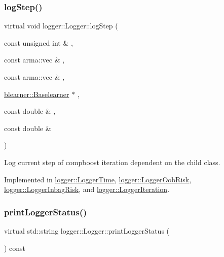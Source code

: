\subsubsection{\texorpdfstring{log\+Step()}{logStep()}}
{\footnotesize\ttfamily virtual void logger\+::\+Logger\+::log\+Step (\begin{DoxyParamCaption}\item[{const unsigned int \&}]{,  }\item[{const arma\+::vec \&}]{,  }\item[{const arma\+::vec \&}]{,  }\item[{\hyperlink{classblearner_1_1_baselearner}{blearner\+::\+Baselearner} $\ast$}]{,  }\item[{const double \&}]{,  }\item[{const double \&}]{ }\end{DoxyParamCaption})\hspace{0.3cm}{\ttfamily [pure virtual]}}



Log current step of compboost iteration dependent on the child class. 



Implemented in \hyperlink{classlogger_1_1_logger_time_aec35d7d3c780043ff2b7c9f71712abbc}{logger\+::\+Logger\+Time}, \hyperlink{classlogger_1_1_logger_oob_risk_a4b0ea670a7970bca31037efab99cc06a}{logger\+::\+Logger\+Oob\+Risk}, \hyperlink{classlogger_1_1_logger_inbag_risk_aa7cb90600de663c51feaaf8a0715a0f9}{logger\+::\+Logger\+Inbag\+Risk}, and \hyperlink{classlogger_1_1_logger_iteration_a155e7fd8c8130211f54804c5ff3a054b}{logger\+::\+Logger\+Iteration}.

\mbox{\label{classlogger_1_1_logger_abad818a7e8053ca84cb267e883b5e377}} 
\subsubsection{\texorpdfstring{print\+Logger\+Status()}{printLoggerStatus()}}
{\footnotesize\ttfamily virtual std\+::string logger\+::\+Logger\+::print\+Logger\+Status (\begin{DoxyParamCaption}{ }\end{DoxyParamCaption}) const\hspace{0.3cm}{\ttfamily [pure virtual]}}



